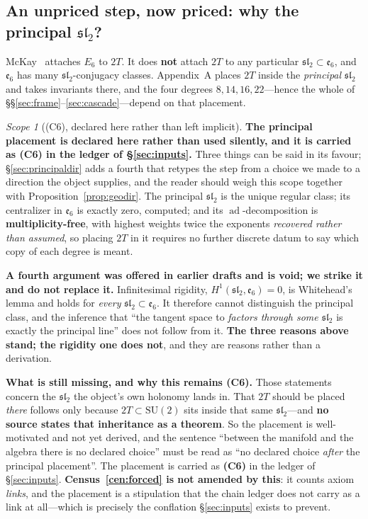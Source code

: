 \documentclass[11pt,reqno]{amsart}
\theoremstyle{plain}
\theoremstyle{definition}
\theoremstyle{remark}
\newtheorem{scope}[theorem]{Scope}
\newcommand{\SU}{\mathrm{SU}}
\newcommand{\sll}{\mathfrak{sl}}
\newcommand{\ee}{\mathfrak{e}}
\newcommand{\ad}{\operatorname{ad}}
\begin{document}
\subsection{An unpriced step, now priced: why the principal $\sll_2$?}\label{sec:principal}

McKay~\cite{McKay} attaches $E_6$ to $2T$. It does \textbf{not} attach $2T$ to any particular
$\sll_2\subset\ee_6$, and $\ee_6$ has many $\sll_2$-conjugacy classes. Appendix~A places
$2T$ inside the \emph{principal} $\sll_2$ and takes invariants there, and the four
degrees $8,14,16,22$---hence the whole of \S\S\ref{sec:frame}--\ref{sec:cascade}---depend
on that placement.

\begin{scope}[(C6), declared here rather than left implicit]\label{sc:principal}
\textbf{The principal placement is declared here rather than used silently, and it is
carried as (C6) in the ledger of \S\ref{sec:inputs}.} Three things can be said in its
favour; \S\ref{sec:principaldir} adds a fourth that retypes the step from a choice we
made to a direction the object supplies, and the reader should weigh this scope together
with Proposition~\ref{prop:geodir}.
The principal $\sll_2$ is the unique regular class; its centralizer in $\ee_6$ is exactly
zero, computed; and its $\ad$-decomposition is \textbf{multiplicity-free}, with highest
weights twice the exponents \emph{recovered rather than assumed}, so placing $2T$ in it
requires no further discrete datum to say which copy of each degree is meant.

\textbf{A fourth argument was offered in earlier drafts and is void; we strike it and do
not replace it.} Infinitesimal rigidity, $H^1(\sll_2,\ee_6)=0$, is Whitehead's lemma and
holds for \emph{every} $\sll_2\subset\ee_6$. It therefore cannot distinguish the
principal class, and the inference that ``the tangent space to \emph{factors through some
$\sll_2$} is exactly the principal line'' does not follow from it. \textbf{The three
reasons above stand; the rigidity one does not}, and they are reasons rather than a
derivation.

\textbf{What is still missing, and why this remains (C6).} Those statements concern the
$\sll_2$ the object's own holonomy lands in. That $2T$ should be placed \emph{there}
follows only because $2T\subset\SU(2)$ sits inside that same $\sll_2$---and \textbf{no
source states that inheritance as a theorem}. So the placement is well-motivated and not
yet derived, and the sentence ``between the manifold and the algebra there is no declared
choice'' must be read as ``no declared choice \emph{after} the principal placement''.
The placement is carried as \textbf{(C6)} in the ledger of \S\ref{sec:inputs}.
\textbf{Census~\ref{cen:forced} is not amended by this}: it counts axiom \emph{links},
and the placement is a stipulation that the chain ledger does not carry as a link at
all---which is precisely the conflation \S\ref{sec:inputs} exists to prevent.
\end{scope}
\end{document}
